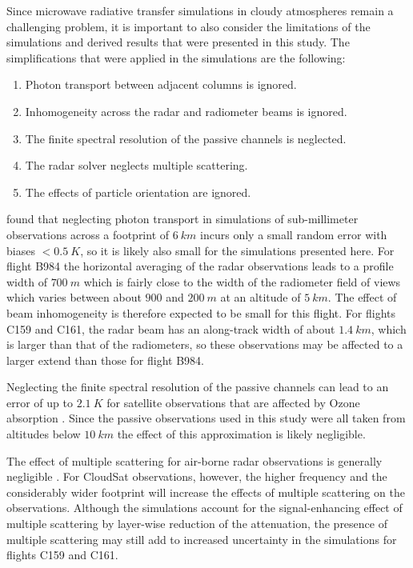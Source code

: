 \documentclass[journal abbreviation, manuscript]{copernicus}
\begin{document}
Since microwave radiative transfer simulations in cloudy atmospheres remain a
challenging problem, it is important to also consider the limitations of the
simulations and derived results that were presented in this study. The
simplifications that were applied in the simulations are the following:
\begin{enumerate}
  \item Photon transport between adjacent columns is ignored.
  \item Inhomogeneity across the radar and radiometer beams is ignored.
  \item The finite spectral resolution of the passive channels is neglected.
  \item The radar solver neglects multiple scattering.
  \item The effects of particle orientation are ignored.
\end{enumerate}

\citet{barlakas20} found that neglecting photon transport in simulations of
sub-millimeter observations across a footprint of $6\ \unit{km}$ incurs only a
small random error with biases $< 0.5\ \unit{K}$, so it is likely also small for
the simulations presented here. For flight B984 the horizontal averaging of the
radar observations leads to a profile width of $700\ \unit{m}$ which is fairly
close to the width of the radiometer field of views which varies between about
$900$ and $200\ \unit{m}$ at an altitude of $5\ \unit{km}$. The effect of beam
inhomogeneity is therefore expected to be small for this flight. For flights
C159 and C161, the radar beam has an along-track width of about
$1.4\ \unit{km}$, which is larger than that of the radiometers, so these
observations may be affected to a larger extend than those for flight B984.

Neglecting the finite spectral resolution of the passive channels can lead to an
error of up to $2.1\ \unit{K}$ for satellite observations that are affected by
Ozone absorption \citep{eriksson20}. Since the passive observations used in this
study were all taken from altitudes below $10\ \unit{km}$ the effect of this
approximation is likely negligible.

The effect of multiple scattering for air-borne radar observations is generally
negligible \citep{battaglia10}. For CloudSat observations, however, the higher
frequency and the considerably wider footprint will increase the effects of
multiple scattering on the observations. Although the simulations account for
the signal-enhancing effect of multiple scattering by layer-wise reduction of
the attenuation, the presence of multiple scattering may still add to increased
uncertainty in the simulations for flights C159 and C161.
\end{document}
